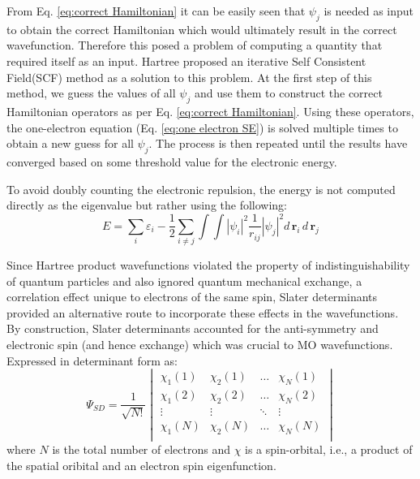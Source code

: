             From Eq. \eqref{eq:correct Hamiltonian} it can be easily seen that $\psi_j$ is needed as input to obtain the correct Hamiltonian which would ultimately result in the correct wavefunction. Therefore this posed a problem of computing a quantity that required itself as an input. Hartree proposed an iterative Self Consistent Field(SCF) method as a solution to this problem. At the first step of this method, we guess the values of all $\psi_j$ and use them to construct the correct Hamiltonian operators as per Eq. \eqref{eq:correct Hamiltonian}. Using these operators, the one-electron \Schrodinger{} equation (Eq. \eqref{eq:one electron SE}) is solved multiple times to obtain a new guess for all $\psi_j$. The process is then repeated until the results have converged based on some threshold value for the electronic energy.

            To avoid doubly counting the electronic repulsion, the energy is not computed directly as the eigenvalue but rather using the following:
            \begin{equation}\label{eq:Hartree Hamiltonian energy}
                E = \displaystyle\sum_i \varepsilon_i - \frac{1}{2} \sum_{i \ne j} \int \int |\psi_i|^2 \frac{1}{r_{ij}} |\psi_j|^2 d\,\mathbf{r}_i\, d\,\mathbf{r}_j
            \end{equation}

            Since Hartree product wavefunctions violated the property of indistinguishability of quantum particles and also ignored quantum mechanical exchange, a correlation effect unique to electrons of the same spin, Slater determinants provided an alternative route to incorporate these effects in the wavefunctions. By construction, Slater determinants accounted for the anti-symmetry and electronic spin (and hence exchange) which was crucial to MO wavefunctions. Expressed in determinant form as:
            \begin{equation}\label{eq:Slater determinant}
                \Psi_{SD} = \frac{1}{\sqrt{N!}}
                \begin{vmatrix}
                    \chi_1 (1) & \chi_2 (1) & \ldots & \chi_N (1)\\
                    \chi_1 (2) & \chi_2 (2) & \ldots & \chi_N (2)\\
                    \vdots & \vdots & \ddots & \vdots\\
                    \chi_1 (N) & \chi_2 (N) & \ldots & \chi_N (N)\\
                \end{vmatrix}
            \end{equation}
            where $N$ is the total number of electrons and $\chi$ is a spin-orbital, i.e., a product of the spatial oribital and an electron spin eigenfunction.

